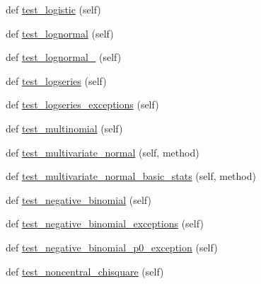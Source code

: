 \begin{DoxyCompactItemize}
\item 
def \hyperlink{classnumpy_1_1random_1_1tests_1_1test__generator__mt19937_1_1TestRandomDist_a608bc3b998c7e95b11e9db8b4b51e215}{test\+\_\+logistic} (self)
\item 
def \hyperlink{classnumpy_1_1random_1_1tests_1_1test__generator__mt19937_1_1TestRandomDist_a3824e5ff66f13f15cfca48ea8e4d7908}{test\+\_\+lognormal} (self)
\item 
def \hyperlink{classnumpy_1_1random_1_1tests_1_1test__generator__mt19937_1_1TestRandomDist_a6c9249a405ce23a65663a1b1bf2fd6dd}{test\+\_\+lognormal\+\_} (self)
\item 
def \hyperlink{classnumpy_1_1random_1_1tests_1_1test__generator__mt19937_1_1TestRandomDist_ae12e7f33e3556093f305c00ec310ecca}{test\+\_\+logseries} (self)
\item 
def \hyperlink{classnumpy_1_1random_1_1tests_1_1test__generator__mt19937_1_1TestRandomDist_a9c8f5b1022024ed2c8e0b697f6949faa}{test\+\_\+logseries\+\_\+exceptions} (self)
\item 
def \hyperlink{classnumpy_1_1random_1_1tests_1_1test__generator__mt19937_1_1TestRandomDist_ac4e3d4fd7dfc9be8c852fe26adfb4a50}{test\+\_\+multinomial} (self)
\item 
def \hyperlink{classnumpy_1_1random_1_1tests_1_1test__generator__mt19937_1_1TestRandomDist_a7ca7db8d457df8389289a12c0525c513}{test\+\_\+multivariate\+\_\+normal} (self, method)
\item 
def \hyperlink{classnumpy_1_1random_1_1tests_1_1test__generator__mt19937_1_1TestRandomDist_a0c5888d3de8638fb1ed892daf8e45305}{test\+\_\+multivariate\+\_\+normal\+\_\+basic\+\_\+stats} (self, method)
\item 
def \hyperlink{classnumpy_1_1random_1_1tests_1_1test__generator__mt19937_1_1TestRandomDist_aa2d3199950905b3f50b6728a43b8cd05}{test\+\_\+negative\+\_\+binomial} (self)
\item 
def \hyperlink{classnumpy_1_1random_1_1tests_1_1test__generator__mt19937_1_1TestRandomDist_a1f7ad92655591ca0a678d24782c33e3d}{test\+\_\+negative\+\_\+binomial\+\_\+exceptions} (self)
\item 
def \hyperlink{classnumpy_1_1random_1_1tests_1_1test__generator__mt19937_1_1TestRandomDist_a04b7ecaa4c16f43b5dcf473a4a8ac49f}{test\+\_\+negative\+\_\+binomial\+\_\+p0\+\_\+exception} (self)
\item 
def \hyperlink{classnumpy_1_1random_1_1tests_1_1test__generator__mt19937_1_1TestRandomDist_a08ba7af17fb17b78af8f0950079e8b1c}{test\+\_\+noncentral\+\_\+chisquare} (self)
\item 

\end{DoxyCompactItemize}
